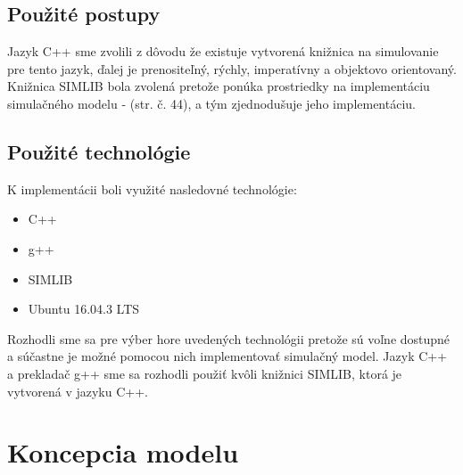 \documentclass[11pt,a4paper]{article}
\begin{document}
    \subsection{Použité postupy}

        Jazyk C++ sme zvolili z dôvodu že existuje vytvorená knižnica na simulovanie pre tento jazyk, ďalej je prenositeľný, rýchly, imperatívny a objektovo orientovaný. Knižnica SIMLIB bola zvolená pretože ponúka prostriedky na implementáciu simulačného modelu - \cite{IMS}(str. č. 44), a tým zjednodušuje jeho implementáciu.

    \subsection{Použité technológie}

        \noindent K implementácii boli využité nasledovné technológie:
        \begin{itemize}
            \item C++ {}
            \item g++ {}
            \item SIMLIB {}
            \item Ubuntu 16.04.3 LTS {}
        \end{itemize}

        \indent Rozhodli sme sa pre výber hore uvedených technológii pretože sú voľne dostupné a súčastne je možné pomocou nich implementovať simulačný model. Jazyk C++ a prekladač g++ sme sa rozhodli použiť kvôli knižnici SIMLIB, ktorá je vytvorená v jazyku C++.

\section{Koncepcia modelu}
\end{document}
